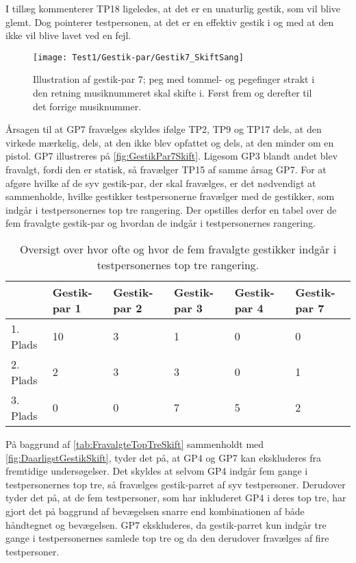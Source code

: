 I tillæg kommenterer TP18 ligeledes, at det er en unaturlig gestik, som vil blive glemt. Dog pointerer testpersonen, at det er en effektiv gestik i og med at den ikke vil blive lavet ved en fejl.
%
\begin{figure}[H]
	\centering
	\texttt{[image: Test1/Gestik-par/Gestik7\_SkiftSang]}
	\caption{Illustration af gestik-par 7; peg med tommel- og pegefinger strakt i den retning musiknummeret skal skifte i. Først frem og derefter til det forrige musiknummer.}
	\label{fig:GestikPar7Skift}
\end{figure}
\noindent
% 
Årsagen til at GP7 fravælges skyldes ifølge TP2, TP9 og TP17 dels, at den virkede mærkelig, dels, at den ikke blev opfattet og dels, at den minder om en pistol. GP7 illustreres på \autoref{fig:GestikPar7Skift}. Ligesom GP3 blandt andet blev fravalgt, fordi den er statisk, så fravælger TP15 af samme årsag GP7.\blankline
%
For at afgøre hvilke af de syv gestik-par, der skal fravælges, er det nødvendigt at sammenholde, hvilke gestikker testpersonerne fravælger med de gestikker, som indgår i testpersonernes top tre rangering. Der opstilles derfor en tabel over de fem fravalgte gestik-par og hvordan de indgår i testpersonernes rangering.    
%
\begin{table}[H]
	\centering
	\begin{tabular}{ | p{1.5cm} | p{2.1cm} | p{2.1cm} | p{2.1cm} | p{2.1cm} | p{2.1cm} |}
	\hline
		 & Gestik-par 1 & Gestik-par 2 & Gestik-par 3 & Gestik-par 4 & Gestik-par 7 \\ \hline
		1. Plads & 10 & 3 & 1 & 0 & 0\\ \hline
		2. Plads & 2 & 3 & 3 & 0 & 1\\ \hline
		3. Plads & 0 & 0 & 7 & 5 & 2\\ \hline
	\end{tabular}
	\caption{Oversigt over hvor ofte og hvor de fem fravalgte gestikker indgår i testpersonernes top tre rangering.}
	\label{tab:FravalgteTopTreSkift}
\end{table}
\noindent
%
På baggrund af \autoref{tab:FravalgteTopTreSkift} sammenholdt med \autoref{fig:DaarligstGestikSkift}, tyder det på, at GP4 og GP7 kan ekskluderes fra fremtidige undersøgelser. Det skyldes at selvom GP4 indgår fem gange i testpersonernes top tre, så fravælges gestik-parret af syv testpersoner. Derudover tyder det på, at de fem testpersoner, som har inkluderet GP4 i deres top tre, har gjort det på baggrund af bevægelsen snarre end kombinationen af både håndtegnet og bevægelsen. GP7 ekskluderes, da gestik-parret kun indgår tre gange i testpersonernes samlede top tre og da den derudover fravælges af fire testpersoner. 
